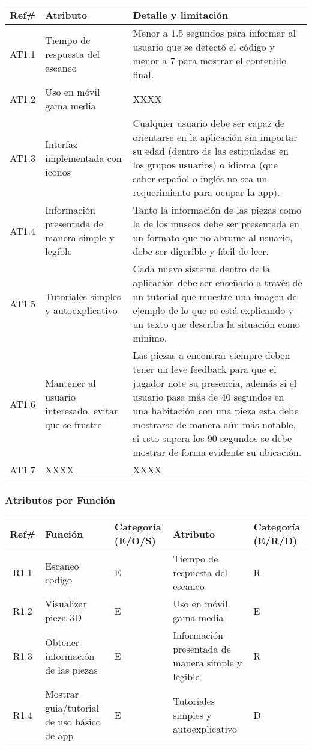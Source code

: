 \begin{longtable}{|c|p{3.5cm}|p{10cm}|}
\hline 
Ref\# & Atributo & Detalle y limitación \\ 
\hline 
AT1.1 & Tiempo de respuesta del escaneo & Menor a 1.5 segundos para informar al usuario que se detectó el código y menor a 7 para mostrar el contenido final.  \\ 
\hline 
AT1.2 & Uso en móvil gama media & XXXX  \\ 
\hline
AT1.3 & Interfaz implementada con iconos & Cualquier usuario debe ser capaz de orientarse en la aplicación sin importar su edad (dentro de las estipuladas en los grupos usuarios) o idioma (que saber español o inglés no sea un requerimiento para ocupar la app).  \\ 
\hline
AT1.4 & Información presentada de manera simple y legible & Tanto la información de las piezas como la de los museos debe ser presentada en un formato que no abrume al usuario, debe ser digerible y fácil de leer.  \\ 
\hline
AT1.5 & Tutoriales simples y autoexplicativo & Cada nuevo sistema dentro de la aplicación debe ser enseñado a través de un tutorial que muestre una imagen de ejemplo de lo que se está explicando y un texto que describa la situación como mínimo.	\\ 
\hline
AT1.6 & Mantener al usuario interesado, evitar que se frustre & Las piezas a encontrar  siempre deben tener un leve feedback para que el jugador note su presencia, además si el usuario pasa más de 40 segundos en una habitación con una pieza esta debe mostrarse de manera aún más notable, si esto supera los 90 segundos se debe mostrar de forma evidente su ubicación.  \\ 
\hline
AT1.7 & XXXX & XXXX  \\ 
\hline
\end{longtable}

\subsubsection{Atributos por Función}

\begin{longtable}{|c|p{4.7cm}|p{1.8cm}|p{4.7cm}|p{1.8cm}|}
\hline 
Ref\# & Función & Categoría (E/O/S) & Atributo & Categoría (E/R/D)\\ 
\hline 
R1.1 & Escaneo codigo & E & Tiempo de respuesta del escaneo & R \\ 
\hline 
R1.2 & Visualizar pieza 3D & E & Uso en móvil gama media & E \\ 
\hline
R1.3 & Obtener información de las piezas & E & Información presentada de manera simple y legible & R \\ 
\hline
R1.4 & Mostrar guia/tutorial de uso básico de app & E & Tutoriales simples y autoexplicativo & D \\ 
\hline
\end{longtable}

